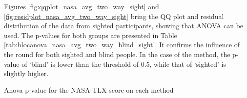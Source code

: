 %
%
Figures \ref{fig:qqplot_nasa_avg_two_way_sight} and \ref{fig:residplot_nasa_avg_two_way_sight} bring the QQ plot and residual distribution of the data from sighted participants, showing that ANOVA can be used. The p-values for both groups are presented in Table \ref{tab:blocanova_nasa_avg_two_way_blind_sight}. It confirms the influence of the round for both sighted and blind people. In the case of the method, the p-value of ‘blind’ is lower than the threshold of 0.5, while that of ‘sighted’ is slightly higher.

\begin{table}
    \caption{Anova p-value for the NASA-TLX score on each method}
    \label{tab:blocanova_nasa_avg_two_way_blind_sight}
    \begin{minipage}{0.45\textwidth}
        
    \end{minipage}
    \begin{minipage}{0.45\textwidth}
            
    \end{minipage}
\end{table}


